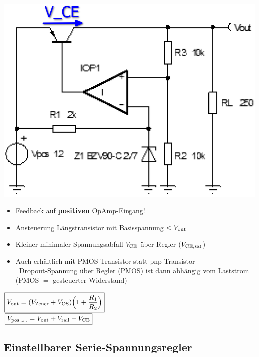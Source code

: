 \begin{minipage}[t]{0.35\columnwidth}
    \includegraphics[align=t, width=\columnwidth]{images/ldo_pnp_transistor.png}
\end{minipage}\hfill%
\begin{minipage}[t]{0.64\columnwidth}
    \begin{itemize}
        \item Feedback auf \textbf{positiven} OpAmp-Eingang!
        \item Ansteuerung Längstransistor mit Basisspannung $< V_{\rm out}$
    \end{itemize}
\end{minipage}
\begin{itemize}
        \item Kleiner minimaler Spannungsabfall $V_{\rm CE}$ über Regler $(V_{\rm CE,sat}$)
        \item Auch erhältlich mit PMOS-Transistor statt pnp-Transistor\\
            \textrightarrow\ Dropout-Spannung über Regler (PMOS) ist dann 
            abhängig vom Laststrom (PMOS $=$ gesteuerter Widerstand)
    \end{itemize}
    \begin{center}
        $ \boxed{ V_{\rm out} = (V_{\rm Zener} + V_{\rm OS}) \Big( 1 + \frac{R_1}{R_2} \Big) }$\\
        $ \boxed{V_{\rm pos_{min}} = V_{\rm out} + V_{\rm rail} - V_{\rm CE}}$
    \end{center}


\subsection{Einstellbarer Serie-Spannungsregler}

